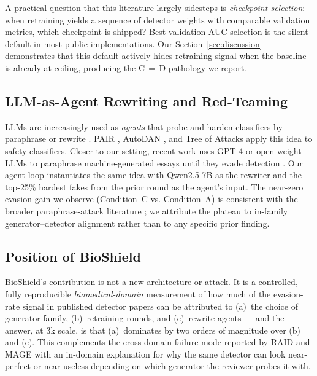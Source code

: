 A practical question that this literature largely sidesteps is
\emph{checkpoint selection}: when retraining yields a sequence of detector
weights with comparable validation metrics, which checkpoint is shipped?
Best-validation-AUC selection is the silent default in most public
implementations. Our Section~\ref{sec:discussion} demonstrates that this
default actively hides retraining signal when the baseline is already at
ceiling, producing the C\,$=$\,D pathology we report.

\subsection{LLM-as-Agent Rewriting and Red-Teaming}
LLMs are increasingly used as \emph{agents} that probe and harden classifiers
by paraphrase or rewrite \cite{perez2022redteaming,ganguli2022redteaming}.
PAIR \cite{chao2024jailbreaking}, AutoDAN \cite{liu2023autodan}, and Tree of
Attacks \cite{mehrotra2024toa} apply this idea to safety classifiers.
Closer to our setting, recent work uses GPT-4 or open-weight LLMs to
paraphrase machine-generated essays until they evade detection
\cite{krishna2023paraphrasing,sadasivan2024aigeneratedtext}. Our agent
loop instantiates the same idea with Qwen2.5-7B as the rewriter and the
top-25\% hardest fakes from the prior round as the agent's input. The
near-zero evasion gain we observe (Condition~C vs. Condition~A) is
consistent with the broader paraphrase-attack literature
\cite{sadasivan2024aigeneratedtext,krishna2023paraphrasing}; we attribute
the plateau to in-family generator--detector alignment rather than to any
specific prior finding.

\subsection{Position of BioShield}
BioShield's contribution is not a new architecture or attack. It is a
controlled, fully reproducible \emph{biomedical-domain} measurement of how
much of the evasion-rate signal in published detector papers can be
attributed to (a)~the choice of generator family, (b)~retraining rounds, and
(c)~rewrite agents — and the answer, at \(3\)k scale, is that (a)~dominates
by two orders of magnitude over (b) and (c). This complements the
cross-domain failure mode reported by RAID \cite{dugan2024raid} and MAGE
\cite{li2024mage} with an in-domain explanation for why the same detector
can look near-perfect or near-useless depending on which generator the
reviewer probes it with.
